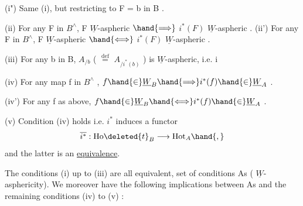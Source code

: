 (i") Same  (i), but restricting to F = b in B .

(ii) For any F in $B^{\wedge}$, F $\underline{W}$-aspheric $\hand{\Longrightarrow}$ $i^{*}(F)$ $\underline{W}$-aspheric .
(ii') For any F in $B^{\wedge}$, F $\underline{W}$-aspheric $\hand{\Longleftrightarrow}$ $i^{*}(F)$ $\underline{W}$-aspheric .

(iii) For any b in B, $A_{/b}$ ( $\overset{\text{def}}{=}$ $A_{/i^*(b)}$ ) is $\underline{W}$-aspheric, i.e. i 

(iv) For any map f in $B^{\wedge}$ , $f \hand{\in} \underline{W}_B \hand{\Longrightarrow} i^{*}(f) \hand{\in} \underline{W}_A$ .

(iv') For any f as above, $f \hand{\in} \underline{W}_B \hand{\Longleftrightarrow} i^{*}(f) \hand{\in} \underline{W}_A$ .

(v) Condition (iv) holds i.e. $i^{*}$ induces a functor
\[ \overline{i^{*}} : \mathrm{Ho}\deleted{t}_B \longrightarrow \mathrm{Hot}_A \hand{,} \]
and  the latter is an \uline{equivalence}.

The conditions (i) up to (iii) are all equivalent,  
 set of conditions \hand{(}As\hand{)} ( $\underline{W}$-asphericity). We moreover have the
following implications between \hand{(}As\hand{)} and the remaining conditions (iv) to
(v) :

